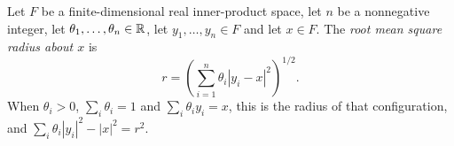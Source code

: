 \begin{definition}
Let $F$ be a finite-dimensional real inner-product space, let $n$ be a
nonnegative integer, let $\theta_1,\ldots,\theta_n\in\mathbb{R}$, let
$y_1,\ldots,y_n\in F$ and let $x\in F$. The \emph{root mean square radius about
$x$} is
\[
  r=\left(\sum_{i=1}^n\theta_i|y_i-x|^2\right)^{1/2}.
\]
When $\theta_i>0$, $\sum_i\theta_i=1$ and $\sum_i\theta_iy_i=x$, this is the
radius of that configuration, and $\sum_i\theta_i|y_i|^2-|x|^2=r^2$.
\end{definition}
